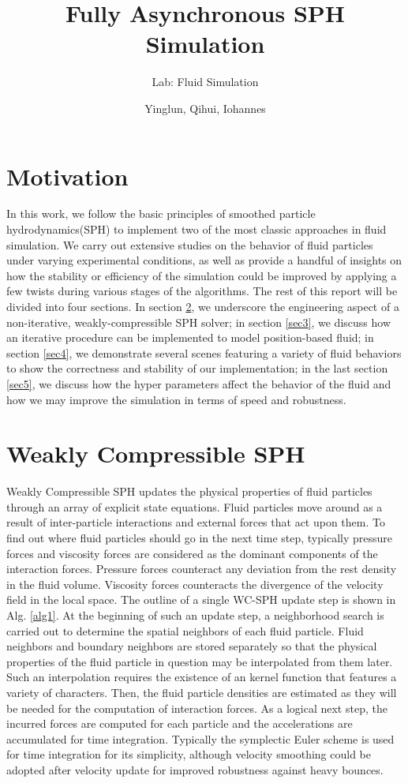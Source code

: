 \documentclass[
	11pt, 
	DIV10,
	ngerman,
	a4paper, 
	oneside, 
	headings=normal, 
	captions=tableheading,
	final, 
	numbers=noenddot
]{scrartcl}
\title{Fully Asynchronous SPH Simulation}
\subtitle{\vspace{0.5cm}Lab: Fluid Simulation}
\author{Yinglun, Qihui, Iohannes}
\begin{document}
\maketitle


\section{Motivation}

In this work, we follow the basic principles of smoothed particle hydrodynamics(SPH) to implement two of the most classic approaches in fluid simulation. We carry out extensive studies on the behavior of fluid particles under varying experimental conditions, as well as provide a handful of insights on how the stability or efficiency of the simulation could be improved by applying a few twists during various stages of the algorithms. The rest of this report will be divided into four sections. In section \ref{sec2}, we underscore the engineering aspect of a non-iterative, weakly-compressible SPH solver; in section \ref{sec3}, we discuss how an iterative procedure can be implemented to model position-based fluid; in section \ref{sec4}, we demonstrate several scenes featuring a variety of fluid behaviors to show the correctness and stability of our implementation; in the last section \ref{sec5}, we discuss how the hyper parameters affect the behavior of the fluid and how we may improve the simulation in terms of speed and robustness.


\section{Weakly Compressible SPH}
\label{sec2}

Weakly Compressible SPH updates the physical properties of fluid particles through an array of explicit state equations. Fluid particles move around as a result of inter-particle interactions and external forces that act upon them. To find out where fluid particles should go in the next time step, typically pressure forces and viscosity forces are considered as the dominant components of the interaction forces. Pressure forces counteract any deviation from the rest density in the fluid volume. Viscosity forces counteracts the divergence of the velocity field in the local space. The outline of a single WC-SPH update step is shown in Alg. \ref{alg1}. At the beginning of such an update step, a neighborhood search is carried out to determine the spatial neighbors of each fluid particle. Fluid neighbors and boundary neighbors are stored separately so that the physical properties of the fluid particle in question may be interpolated from them later. Such an interpolation requires the existence of an kernel function that features a variety of characters. Then, the fluid particle densities are estimated as they will be needed for the computation of interaction forces. As a logical next step, the incurred forces are computed for each particle and the accelerations are accumulated for time integration. Typically the symplectic Euler scheme is used for time integration for its simplicity, although velocity smoothing could be adopted after velocity update for improved robustness against heavy bounces.
\end{document}
